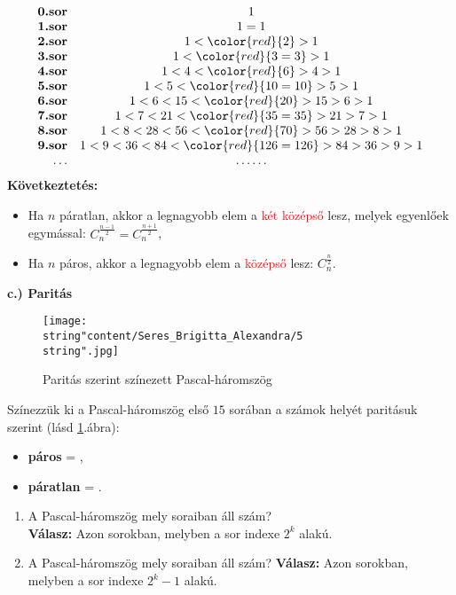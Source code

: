\[
\begin{array}{rc}
\textbf{0.sor} & 1\\
\textbf{1.sor} & 1=1\\
\textbf{2.sor} & 1<{\color{red}{2}}>1\\
\textbf{3.sor} & 1<{\color{red}{3=3}}>1\\
\textbf{4.sor} & 1<4<{\color{red}{6}}>4>1\\
\textbf{5.sor} & 1<5<{\color{red}{10=10}}>5>1\\
\textbf{6.sor} & 1<6<15<{\color{red}{20}}>15>6>1\\
\textbf{7.sor} & 1<7<21<{\color{red}{35=35}}>21>7>1\\
\textbf{8.sor} & 1<8<28<56<{\color{red}{70}}>56>28>8>1\\
\textbf{9.sor} & 1<9<36<84<{\color{red}{126=126}}>84>36>9>1\\
\ldots & \ldots\ldots
\end{array}
\]
\textbf{Következtetés:} 
\begin{itemize}
\item Ha $n$ páratlan, akkor a legnagyobb elem a \textcolor{red}{két középső}
lesz, melyek egyenlőek egymással: $C_{n}^{\frac{n-1}{2}}=C_{n}^{\frac{n+1}{2}}$, 
\item Ha $n$ páros, akkor a legnagyobb elem a \textcolor{red}{középső}
lesz: $C_{n}^{\frac{n}{2}}$. 
\end{itemize}

\textbf{c.) Paritás}

\vspace{0.2cm}

\begin{figure}[h]
\centering \texttt{[image: \\string"content/Seres\_Brigitta\_Alexandra/5\\string".jpg]}
\caption{Paritás szerint színezett Pascal-háromszög}
\label{7sb4} 
\end{figure}

Színezzük ki a Pascal-háromszög első $15$ sorában a számok helyét
paritásuk szerint (lásd \ref{7sb4}.ábra): 
\begin{itemize}
\item \textbf{páros} = {\color{blue}{kék}}, 
\item \textbf{páratlan} = {\color{red}{piros}}. 
\end{itemize}
\begin{enumerate}
\item A Pascal-háromszög mely soraiban áll {\color{blue}{(a szélétől
eltekintve) mindenütt páros}} szám?\\
 \textbf{Válasz:} Azon sorokban, melyben a sor indexe $2^{k}$ alakú.
\item A Pascal-háromszög mely soraiban áll {\color{red}{mindenütt páratlan}}
szám? \textbf{Válasz:} Azon sorokban, melyben a sor indexe $2^{k}-1$
alakú.
\end{enumerate}
\vspace{0.3cm}

